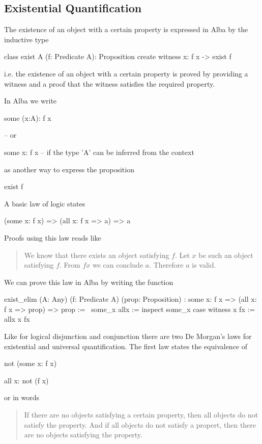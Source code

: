\subsection{Existential Quantification}

The existence of an object with a certain property is expressed in Alba by the
inductive type
%
\begin{alba}
    class
        exist A (f: Predicate A): Proposition
    create
        witness x: f x -> exist f
\end{alba}
%
i.e. the existence of an object with a certain property is proved by providing
a witness and a proof that the witness satisfies the required property.

In Alba we write
%
\begin{alba}
  some (x:A): f x

  -- or

  some x: f x   -- if the type 'A' can be inferred from the context
\end{alba}
%
as another way to express the proposition
%
\begin{alba}
  exist f
\end{alba}

A basic law of logic states
%
\begin{alba}
  (some x: f x) => (all x: f x => a) => a
\end{alba}
%
Proofs using this law reads like
\begin{quote}
  We know that there exists an object satisfying $f$. Let $x$ be such an
  object satisfying $f$. From $ f x$ we can conclude $a$. Therefore $a$ is
  valid.
\end{quote}

We can prove this law in Alba by writing the function
\begin{alba}
    exist_elim
        (A: Any)
        (f: Predicate A)
        (prop: Proposition)
        : some x: f x => (all x: f x => prop) => prop
    :=
        \   some_x
            allx
        :=
            inspect some_x case
                witness x fx :=
                    allx x fx
\end{alba}


Like for logical disjunction and conjunction there are two De Morgan's laws for
existential and universal quantification. The first law states the equivalence
of
\begin{alba}
  not (some x: f x)

  all x: not (f x)
\end{alba}
or in words
\begin{quote}
  If there are no objects satisfying a certain property, then all objects do
  not satisfy the property. And if all objects do not satisfy a propert, then
  there are no objects satisfying the property.
\end{quote}

